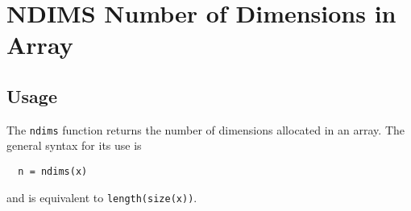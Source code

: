 \section{NDIMS Number of Dimensions in Array}

\subsection{Usage}

The \verb|ndims| function returns the number of dimensions
allocated in an array.  The general syntax for its
use is
\begin{verbatim}
  n = ndims(x)
\end{verbatim}
and is equivalent to \verb|length(size(x))|.
